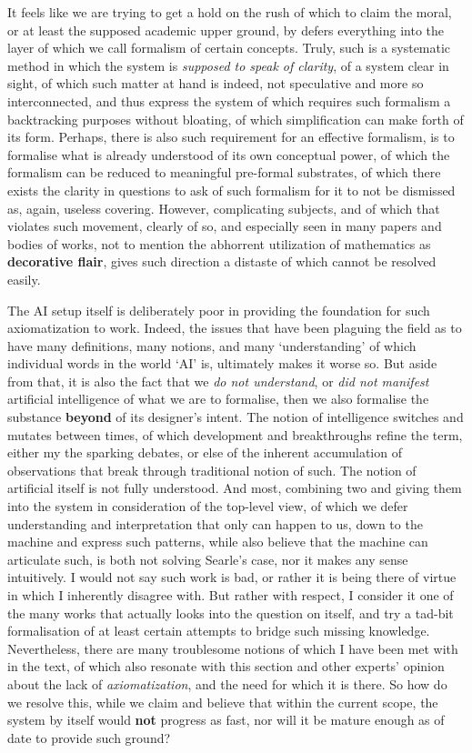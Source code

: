 It feels like we are trying to get a hold on the rush of which to claim the moral, or at least the supposed academic upper ground, by defers everything into the layer of which we call formalism of certain concepts. Truly, such is a systematic method in which the system is \textit{supposed to speak of clarity}, of a system clear in sight, of which such matter at hand is indeed, not speculative and more so interconnected, and thus express the system of which requires such formalism a backtracking purposes without bloating, of which simplification can make forth of its form. Perhaps, there is also such requirement for an effective formalism, is to formalise what is already understood of its own conceptual power, of which the formalism can be reduced to meaningful pre-formal substrates, of which there exists the clarity in questions to ask of such formalism for it to not be dismissed as, again, useless covering. However, complicating subjects, and of which that violates such movement, clearly of so, and especially seen in many papers and bodies of works, not to mention the abhorrent utilization of mathematics as \textbf{decorative flair}, gives such direction a distaste of which cannot be resolved easily. 

The AI setup itself is deliberately poor in providing the foundation for such axiomatization to work. Indeed, the issues that have been plaguing the field as to have many definitions, many notions, and many `understanding' of which individual words in the world `AI' is, ultimately makes it worse so. But aside from that, it is also the fact that we \textit{do not understand}, or \textit{did not manifest} artificial intelligence of what we are to formalise, then we also formalise the substance \textbf{beyond} of its designer's intent. The notion of intelligence switches and mutates between times, of which development and breakthroughs refine the term, either my the sparking debates, or else of the inherent accumulation of observations that break through traditional notion of such. The notion of artificial itself is not fully understood. And most, combining two and giving them into the system in consideration of the top-level view, of which we defer understanding and interpretation that only can happen to us, down to the machine and express such patterns, while also believe that the machine can articulate such, is both not solving Searle's case, nor it makes any sense intuitively. I would not say such work is bad, or rather it is being there of virtue in which I inherently disagree with. But rather with respect, I consider it one of the many works that actually looks into the question on itself, and try a tad-bit formalisation of at least certain attempts to bridge such missing knowledge. Nevertheless, there are many troublesome notions of which I have been met with in the text, of which also resonate with this section and other experts' opinion about the lack of \textit{axiomatization}, and the need for which it is there. So how do we resolve this, while we claim and believe that within the current scope, the system by itself would \textbf{not} progress as fast, nor will it be mature enough as of date to provide such ground? 

